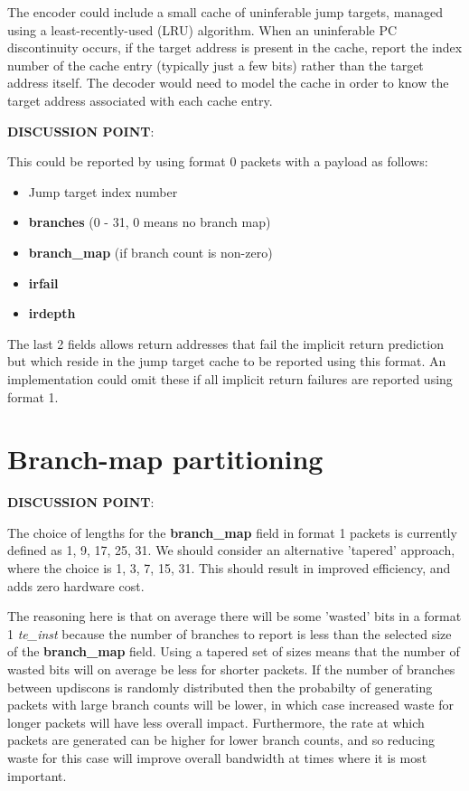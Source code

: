 The encoder could include a small cache of uninferable jump targets, managed using a
least-recently-used (LRU) algorithm.  When an uninferable PC discontinuity occurs, if 
the target address is present in the cache, report the index number of the cache
entry (typically just a few bits) rather than the target address itself.  The decoder 
would need to model the cache in order to know the target address associated with
each cache entry.

\textbf{DISCUSSION POINT}:

This could be reported by using format 0 packets with a payload as follows:

\begin{itemize}
  \item Jump target index number
  \item \textbf{branches} (0 - 31, 0 means no branch map)
  \item \textbf{branch\_map} (if branch count is non-zero)
  \item \textbf{irfail} 
  \item \textbf{irdepth}
\end{itemize}

The last 2 fields allows return addresses that fail the implicit return prediction but 
which reside in the jump target cache to be reported using this format.  An implementation
could omit these if all implicit return failures are reported using format 1.

\section{Branch-map partitioning}

\textbf{DISCUSSION POINT}:

The choice of lengths for the \textbf{branch\_map} field in format 1 packets is currently defined as
1, 9, 17, 25, 31.  We should consider an alternative 'tapered' approach, where the choice is 1, 3, 7, 15, 31.
This should result in improved efficiency, and adds zero hardware cost.

The reasoning here is that on average there will be some 'wasted' bits in a format 1 \textit{te\_inst}
because the number of branches to report is less than the selected size of the \textbf{branch\_map} field.
Using a tapered set of sizes means that the number of wasted bits will on average be less for shorter packets.
If the number of branches between updiscons is randomly distributed then the probabilty of generating packets with large
branch counts will be lower, in which case increased waste for longer packets will have less overall impact.
Furthermore, the rate at which packets are generated can be higher for lower branch counts, and so reducing
waste for this case will improve overall bandwidth at times where it is most important.

